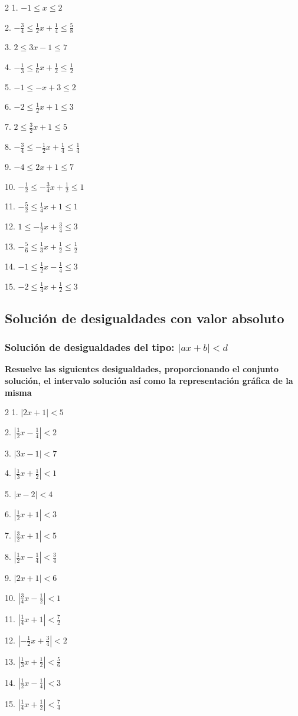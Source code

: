 \documentclass[12pt]{article}
\begin{document}
\begin{multicols}{2}
1. $-1\leq x\leq 2$

2. $-\frac{3}{4}\leq \frac{1}{2}x+\frac{1}{4}\leq \frac{5}{8}$

3. $2\leq 3x-1\leq 7$

4. $-\frac{1}{3}\leq \frac{1}{6}x+\frac{1}{2}\leq \frac{1}{2}$

5. $-1\leq -x+3\leq 2$

6. $-2\leq \frac{1}{2}x+1\leq 3$

7. $2\leq \frac{3}{2}x+1\leq 5$

8. $-\frac{3}{4}\leq -\frac{1}{2}x+\frac{1}{4}\leq \frac{1}{4}$

9. $-4\leq 2x+1\leq 7$

10. $-\frac{1}{2}\leq -\frac{3}{4}x+\frac{1}{2}\leq 1$

11. $-\frac{5}{2}\leq \frac{1}{4}x+1\leq 1$

12. $1\leq -\frac{1}{2}x+\frac{3}{4}\leq 3$

13. $-\frac{5}{6}\leq \frac{1}{3}x+\frac{1}{2}\leq \frac{1}{2}$

14. $-1\leq \frac{1}{2}x-\frac{1}{4}\leq 3$

15. $-2\leq \frac{1}{4}x+\frac{1}{2}\leq 3$
\end{multicols}

\subsection{Solución de desigualdades con valor
absoluto}\label{soluciuxf3n-de-desigualdades-con-valor-absoluto}
\subsubsection{\texorpdfstring{Solución de desigualdades del tipo:
\(|ax+b| <d\)}{Solución de desigualdades del tipo: \textbar ax+b\textbar{} \textless d}}\label{soluciuxf3n-de-desigualdades-del-tipo-axb-d}
\textbf{Resuelve las siguientes desigualdades, proporcionando el
conjunto solución, el intervalo solución así como la representación
gráfica de la misma}

\begin{multicols}{2}
1. $|2x+1|<5$

2. $|\frac{1}{2}x-\frac{1}{4}|<2$

3. $|3x-1|<7$

4. $|\frac{1}{3}x+\frac{1}{2}|<1$

5. $|x-2|<4$

6. $|\frac{1}{2}x+1|<3$

7. $|\frac{3}{2}x+1|<5$

8. $|\frac{1}{2}x-\frac{1}{4}|<\frac{3}{4}$

9. $|2x+1|<6$

10. $|\frac{3}{4}x-\frac{1}{2}|<1$

11. $|\frac{1}{4}x+1|<\frac{7}{2}$

12. $|-\frac{1}{2}x+\frac{3}{4}|<2$

13. $|\frac{1}{3}x+\frac{1}{2}|<\frac{5}{6}$

14. $|\frac{1}{2}x-\frac{1}{4}|<3$

15. $|\frac{1}{4}x+\frac{1}{2}|<\frac{7}{4}$
\end{multicols}
\end{document}
